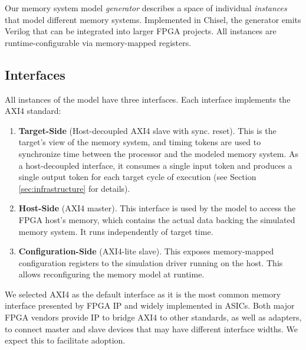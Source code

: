 
Our memory system model \textit{generator} describes a space of individual
\textit{instances} that model different memory systems. Implemented in
Chisel\cite{Chisel}, the generator emits Verilog that can be integrated into
larger FPGA projects. All instances are runtime-configurable via memory-mapped registers.

\subsection{Interfaces}

All instances of the model have three interfaces. Each interface implements the AXI4 standard:

\begin{enumerate} \item \textbf{Target-Side} (Host-decoupled AXI4 slave with sync. reset). This
is the target's view of the memory system, and timing tokens are used to synchronize time between the processor and the modeled memory system. As a host-decoupled interface, it consumes a single input token and produces a single output token for each target cycle of execution (see Section \ref{sec:infrastructure} for details). 

    \item \textbf{Host-Side} (AXI4 master). This interface is used by the model to access the FPGA host's memory, which contains the actual data backing the simulated memory system. It runs independently of target time.

    \item \textbf{Configuration-Side} (AXI4-lite slave). This exposes
        memory-mapped configuration registers to the simulation driver running on the host. This allows reconfiguring the memory model at runtime.
\end{enumerate}

We selected AXI4 as the default interface as it is the most common memory
interface presented by FPGA IP and widely implemented in ASICs. Both major FPGA
vendors provide IP to bridge AXI4 to other standards, as well as adapters, to
connect master and slave devices that may have different interface widths. We expect
this to facilitate adoption. 


